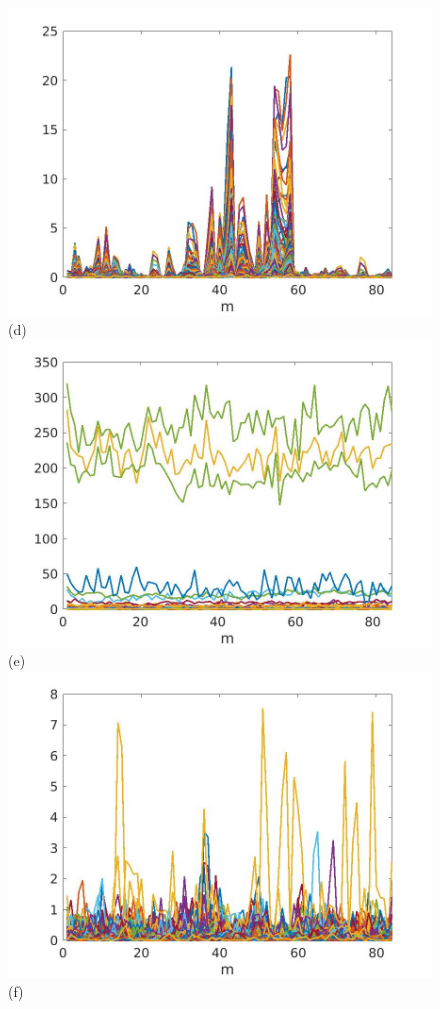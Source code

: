 \documentclass[journal]{IEEEtran}
\begin{document}
\begin{figure}[htp!]
\includegraphics[scale=.12]{../../figs/consecdif_J3_euclid_sqrdif_change_locations}(d)\\
\includegraphics[scale=.12]{../../figs/J3_euclid_sqrdif_lowest_cor_locations}(e)
\includegraphics[scale=.12]{../../figs/consecdif_J3_euclid_sqrdif_lowest_cor_locations}(f)\\

\end{figure}
\end{document}
